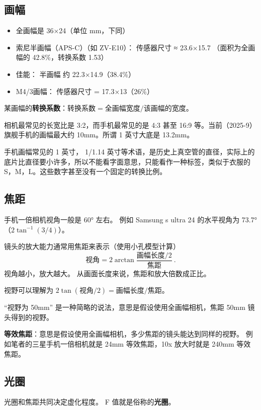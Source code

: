 
\subsection{画幅}
\begin{itemize}
\item 全画幅是 36×24（单位 mm，下同）
\item 索尼半画幅（APS-C）（如 ZV-E10）： 传感器尺寸 ≈ 23.6×15.7 （面积为全画幅的 42.8\%，转换系数 1.53）
\item 佳能： 半画幅 约 22.3×14.9（38.4\%）
\item M4/3画幅： 传感器尺寸 = 17.3×13（26\%）
\end{itemize}

某画幅的\textbf{转换系数}：$\text{转换系数} = \text{全画幅宽度}/\text{该画幅的宽度}$。

相机最常见的长宽比是 3:2，而手机最常见的是 4:3 甚至 16:9 等。当前（2025-9）旗舰手机的画幅最大约 10mm。所谓 1 英寸大底是 13.2mm。

手机画幅常见的 1 英寸， 1/1.14 英寸等术语，是历史上真空管的直径，实际上的底片比直径要小许多，所以不能看字面意思，只能看作一种标签，类似于衣服的 S，M，L。这些数字甚至没有一个固定的转换比例。

\subsection{焦距}
手机一倍相机视角一般是 60° 左右。 例如 Samsung s ultra 24 的水平视角为 73.7°（$2\tan^{-1}(3/4)$）。

镜头的放大能力通常用焦距来表示（使用小孔模型计算）
\begin{equation}
\text{视角} = 2\arctan{\frac{\text{画幅长度/2}}{\text{焦距}}}~.
\end{equation}
视角越小，放大越大。 从画面长度来说，焦距和放大倍数成正比。

视野可以理解为 $2\tan(\text{视角}/2) = \text{画幅长度}/{\text{焦距}}$。

“视野为 50mm” 是一种简略的说法，意思是假设使用全画幅相机，焦距 50mm 镜头得到的视野。

\textbf{等效焦距}：意思是假设使用全画幅相机，多少焦距的镜头能达到同样的视野。 例如笔者的三星手机一倍相机就是 24mm 等效焦距，10x 放大时就是 240mm 等效焦距。


\subsection{光圈}
光圈和焦距共同决定虚化程度。 F 值就是俗称的\textbf{光圈}。

